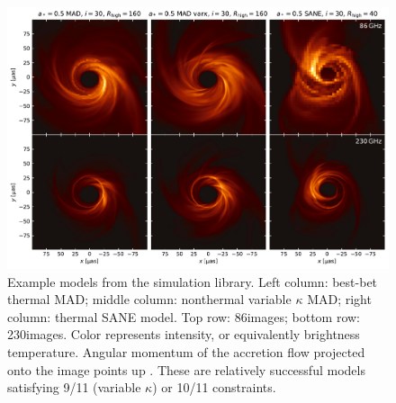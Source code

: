 \begin{figure}
  \centering
  \includegraphics[width=\textwidth]{figures/example_imgs.pdf}
  \caption{Example models from the simulation library.  Left column: best-bet thermal MAD; middle column: nonthermal variable $\kappa$ MAD; right column: thermal SANE model.  Top row: 86\GHz images; bottom row: 230\GHz images.  Color represents intensity, or equivalently brightness temperature.  Angular momentum of the accretion flow projected onto the image points up .  These are relatively successful models satisfying 9/11 (variable $\kappa$) or 10/11 constraints.
  }
  \label{fig:example_imgs}
\end{figure}

